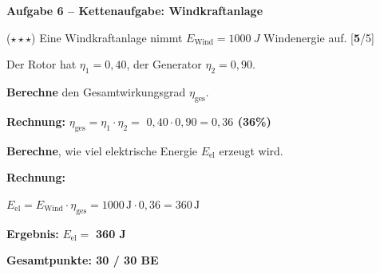 \documentclass[11pt, a4paper]{article}
\newcommand{\maxpunkte}{30}
\newcommand{\lsg}[1]{\textcolor{loesung}{\textbf{#1}}}
\newcommand{\punktebox}[1]{\hfill\small\textcolor{mittelgrau}{[\lsg{#1}/#1]}}
\newcommand{\aufgabe}[1]{%
    \needspace{4\baselineskip}%
    \vspace{10pt}%
    \noindent\textbf{\textcolor{fachfarbe}{Aufgabe #1}}%
    \vspace{4pt}%
    \nopagebreak[4]%
}
\newcommand{\operator}[1]{\textbf{\textcolor{fachfarbe}{#1}}}
\begin{document}
\vspace{0.5em}

\aufgabe{6 – Kettenaufgabe: Windkraftanlage}

($\star\star\star$) Eine Windkraftanlage nimmt $E_\text{Wind} = \SI{1000}{J}$ Windenergie auf. \punktebox{5}

Der Rotor hat $\eta_1 = 0{,}40$, der Generator $\eta_2 = 0{,}90$.

\begin{teil}
\item \operator{Berechne} den Gesamtwirkungsgrad $\eta_\text{ges}$.

\vspace{4pt}
\textbf{Rechnung:} $\eta_\text{ges} = \eta_1 \cdot \eta_2 = $ \lsg{$0{,}40 \cdot 0{,}90 = 0{,}36$ (36\%)}

\vspace{4pt}

\item \operator{Berechne}, wie viel elektrische Energie $E_\text{el}$ erzeugt wird.

\vspace{6pt}
\textbf{Rechnung:}

\lsg{$E_\text{el} = E_\text{Wind} \cdot \eta_\text{ges} = 1000\,\text{J} \cdot 0{,}36 = 360\,\text{J}$}

\textbf{Ergebnis:} $E_\text{el} = $ \lsg{360 J}
\end{teil}


\vfill
\begin{center}
\small\textcolor{loesung}{\textbf{Gesamtpunkte: \maxpunkte{} / \maxpunkte{} BE}}
\end{center}
\end{document}
